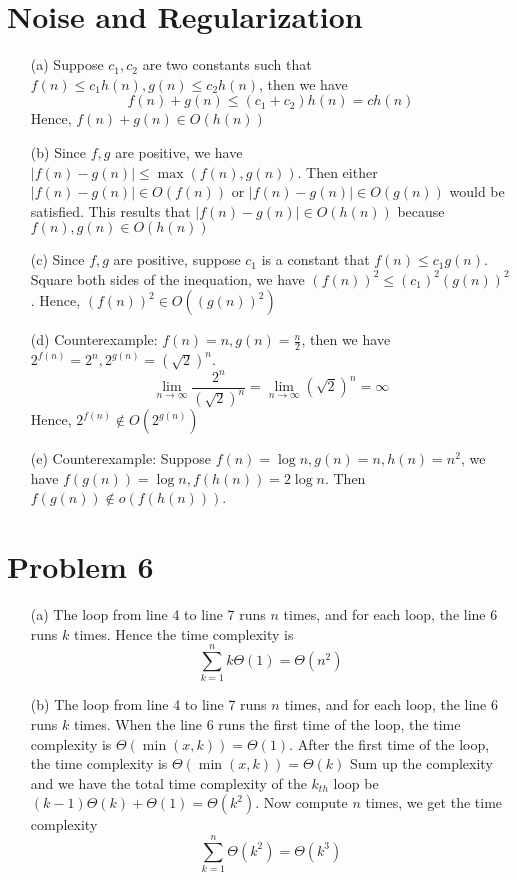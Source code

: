 \documentclass[12pt,a4paper]{article}
\begin{document}
\section{Noise and Regularization}

\begin{enumerate}
    \item[(a)] 
        Suppose $c_1, c_2$ are two constants such that $f(n)\leq c_1h(n), g(n)\leq c_2h(n)$, then we have
        \[
            f(n) + g(n) \leq (c_1 + c_2)h(n) = ch(n)
        \]
        Hence, $f(n) + g(n) \in O(h(n))$
    \item[(b)]
        Since $f, g$ are positive, we have $\left\lvert f(n) - g(n) \right\rvert \leq \max(f(n), g(n))$. Then either $\left\lvert f(n) - g(n) \right\rvert \in O(f(n))$ or $\left\lvert f(n) - g(n) \right\rvert \in O(g(n))$ would be satisfied.
        This results that $\left\lvert f(n) - g(n) \right\rvert \in O(h(n))$ because $f(n), g(n) \in O(h(n))$
    \item[(c)]
        Since $f, g$ are positive, suppose $c_1$ is a constant that $f(n)\leq c_1g(n)$. Square both sides of the inequation, we have $(f(n))^2 \leq (c_1)^2(g(n))^2$.
        Hence, $(f(n))^2 \in O((g(n))^2)$
    \item[(d)]
        Counterexample: $f(n) = n, g(n) = \frac{n}{2}$, then we have $2^{f(n)} = 2^{n}, 2^{g(n)} = (\sqrt{2})^{n}$.
        \[
            \lim_{n\to\infty} \frac{2^{n}}{(\sqrt{2})^n} = \lim_{n\to\infty} (\sqrt{2})^n = \infty
        \]
        Hence, $2^{f(n)} \notin O(2^{g(n)})$
    \item[(e)] 
        Counterexample: Suppose $f(n) = \log n, g(n) = n, h(n) = n^{2}$, we have $f(g(n)) = \log n, f(h(n)) = 2\log n$. Then $f(g(n)) \notin o(f(h(n)))$. 
\end{enumerate}

\section*{Problem 6}

\begin{enumerate}
    \item[(a)]
        The loop from line 4 to line 7 runs $n$ times, and for each loop, the line 6 runs $k$ times. 
        Hence the time complexity is 
        \[
            \sum_{k=1}^{n} k\Theta(1) = \Theta(n^2)
        \]
    \item[(b)] 
        The loop from line 4 to line 7 runs $n$ times, and for each loop, the line 6 runs $k$ times.
        When the line 6 runs the first time of the loop, the time complexity is $\Theta(\min(x, k)) = \Theta(1)$.
        After the first time of the loop, the time complexity is $\Theta(\min(x, k)) = \Theta(k)$
        Sum up the complexity and we have the total time complexity of the $k_{th}$ loop be $(k-1)\Theta(k) + \Theta(1) = \Theta(k^2)$.
        Now compute $n$ times, we get the time complexity
        \[
            \sum_{k=1}^{n} \Theta(k^2) = \Theta(k^3)
        \]
\end{enumerate}
\end{document}
